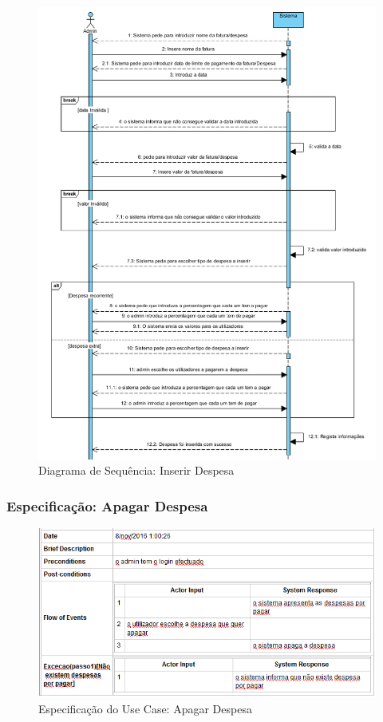 \newpage

\begin{figure}[htb!]
	\centering
	\includegraphics[scale=0.5]{imagens/DiagramaSeq/InserirDespesa}  
	\caption{Diagrama de Sequência: Inserir Despesa}  
\end{figure}

\newpage

\subsubsection{Especificação: Apagar Despesa}

\begin{figure}[htb!]
	\centering
	\includegraphics[scale=0.6]{imagens/Especificacoes/apagardespesa}  
	\caption{Especificação do Use Case: Apagar Despesa}  
\end{figure}

